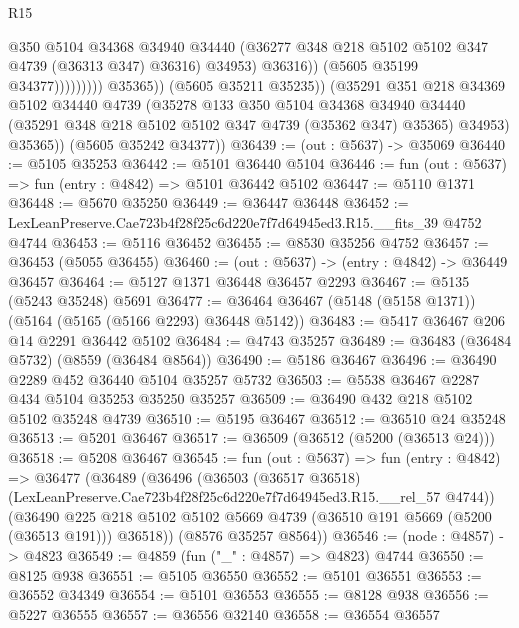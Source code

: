 \begin{lexlean}{R15}
\begin{coremodule}
{{{{{{{{{{{                                    @350
                                    @5104
                                    @34368
                                    @34940
                                    @34440
                                    (@36277 @348 @218 @5102 @5102 @347 @4739 (@36313 @347) @36316)
                                    @34953)
                                  @36316))
                              (@5605 @35199 @34377)))))))))
              @35365))
          (@5605 @35211 @35235))
        (@35291
          @351
          @218
          @34369
          @5102
          @34440
          @4739
          (@35278
            @133
            @350
            @5104
            @34368
            @34940
            @34440
            (@35291 @348 @218 @5102 @5102 @347 @4739 (@35362 @347) @35365)
            @34953)
          @35365))
      (@5605 @35242 @34377))
@36439 := (out : @5637) -> @35069
@36440 := @5105 @35253
@36442 := @5101 @36440 @5104
@36446 := fun (out : @5637) => fun (entry : @4842) => @5101 @36442 @5102
@36447 := @5110 @1371
@36448 := @5670 @35250
@36449 := @36447 @36448
@36452 := LexLeanPreserve.Cae723b4f28f25c6d220e7f7d64945ed3.R15.__fits_39 @4752 @4744
@36453 := @5116 @36452
@36455 := @8530 @35256 @4752
@36457 := @36453 (@5055 @36455)
@36460 := (out : @5637) -> (entry : @4842) -> @36449 @36457
@36464 := @5127 @1371 @36448 @36457 @2293
@36467 := @5135 (@5243 @35248) @5691
@36477 := @36464 @36467 (@5148 (@5158 @1371)) (@5164 (@5165 (@5166 @2293) @36448 @5142))
@36483 := @5417 @36467 @206 @14 @2291 @36442 @5102
@36484 := @4743 @35257
@36489 := @36483 (@36484 @5732) (@8559 (@36484 @8564))
@36490 := @5186 @36467
@36496 := @36490 @2289 @452 @36440 @5104 @35257 @5732
@36503 := @5538 @36467 @2287 @434 @5104 @35253 @35250 @35257
@36509 := @36490 @432 @218 @5102 @5102 @35248 @4739
@36510 := @5195 @36467
@36512 := @36510 @24 @35248
@36513 := @5201 @36467
@36517 := @36509 (@36512 (@5200 (@36513 @24)))
@36518 := @5208 @36467
@36545 := fun (out : @5637) =>
  fun (entry : @4842) =>
  @36477
    (@36489
      (@36496
        (@36503
          (@36517 @36518)
          (LexLeanPreserve.Cae723b4f28f25c6d220e7f7d64945ed3.R15.__rel_57 @4744))
        (@36490 @225 @218 @5102 @5102 @5669 @4739 (@36510 @191 @5669 (@5200 (@36513 @191))) @36518))
      (@8576 @35257 @8564))
@36546 := (node : @4857) -> @4823
@36549 := @4859 (fun ("_" : @4857) => @4823) @4744
@36550 := @8125 @938
@36551 := @5105 @36550
@36552 := @5101 @36551
@36553 := @36552 @34349
@36554 := @5101 @36553
@36555 := @8128 @938
@36556 := @5227 @36555
@36557 := @36556 @32140
@36558 := @36554 @36557
}}}}}}}}}}}
\end{coremodule}
\end{lexlean}
